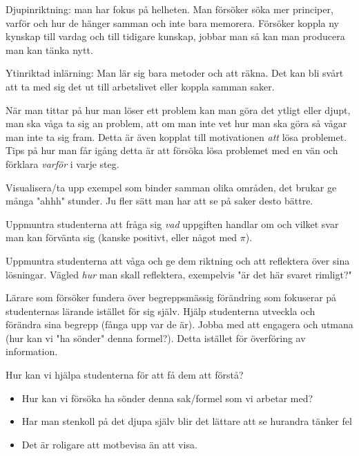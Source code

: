 \noindent Djupinriktning: man har fokus på helheten. Man försöker söka mer principer, varför och hur de hänger samman och inte bara memorera. Försöker koppla ny kynskap till vardag och till tidigare kunskap, jobbar man så kan man producera man kan tänka nytt.
\par\bigskip
\noindent Ytinriktad inlärning: Man lär sig bara metoder och att räkna. Det kan bli svårt att ta med sig det ut till arbetslivet eller koppla samman saker.
\par\bigskip
\noindent När man tittar på hur man löser ett problem kan man göra det ytligt eller djupt, man ska våga ta sig an problem, att om man inte vet hur man ska göra så vågar man inte ta sig fram. Detta är även kopplat till motivationen \textit{att} lösa problemet. Tips på hur man får igång detta är att försöka lösa problemet med en vän och förklara \textit{varför} i varje steg.
\par\bigskip
\noindent Visualisera/ta upp exempel som binder samman olika områden, det brukar ge många "ahhh" stunder. Ju fler sätt man har att se på saker desto bättre.
\par\bigskip
\noindent Uppmuntra studenterna att fråga sig \textit{vad} uppgiften handlar om och vilket svar man kan förvänta sig (kanske positivt, eller något med $\pi$).\par
\noindent Uppmuntra studenterna att våga och ge dem riktning och att reflektera över sina lösningar. Vägled \textit{hur} man skall reflektera, exempelvis "är det här svaret rimligt?"
\par\bigskip
\noindent Lärare som försöker fundera över begreppsmässig förändring som fokuserar på studenternas lärande istället för sig själv. Hjälp studenterna utveckla och förändra sina begrepp (fånga upp var de är). Jobba med att engagera och utmana (hur kan vi "ha sönder" denna formel?). Detta istället för överföring av information.
\par\bigskip
\noindent Hur kan vi hjälpa studenterna för att få dem att förstå?

\begin{itemize}
  \item Hur kan vi försöka ha sönder denna sak/formel som vi arbetar med?
  \item Har man stenkoll på det djupa själv blir det lättare att se hurandra tänker fel
  \item Det är roligare att motbevisa än att visa.
\end{itemize}
\par\bigskip

